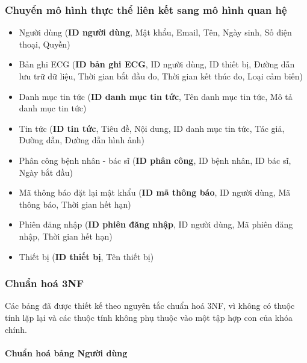 \subsubsection{Chuyển mô hình thực thể liên kết sang mô hình quan hệ}

\begin{itemize}
  \item Người dùng (\textbf{ID người dùng}, Mật khẩu, Email, Tên, Ngày sinh, Số điện thoại, Quyền)
  \item Bản ghi ECG (\textbf{ID bản ghi ECG}, ID người dùng, ID thiết bị, Đường dẫn lưu trữ dữ liệu, Thời gian bắt đầu đo, Thời gian kết thúc đo, Loại cảm biến)
  \item Danh mục tin tức (\textbf{ID danh mục tin tức}, Tên danh mục tin tức, Mô tả danh mục tin tức)
  \item Tin tức (\textbf{ID tin tức}, Tiêu đề, Nội dung, ID danh mục tin tức, Tác giả, Đường dẫn, Đường dẫn hình ảnh)
  \item Phân công bệnh nhân - bác sĩ (\textbf{ID phân công}, ID bệnh nhân, ID bác sĩ, Ngày bắt đầu)
  \item Mã thông báo đặt lại mật khẩu (\textbf{ID mã thông báo}, ID người dùng, Mã thông báo, Thời gian hết hạn)
  \item Phiên đăng nhập (\textbf{ID phiên đăng nhập}, ID người dùng, Mã phiên đăng nhập, Thời gian hết hạn)
  \item Thiết bị (\textbf{ID thiết bị}, Tên thiết bị)
\end{itemize}


\subsubsection{Chuẩn hoá 3NF}
Các bảng đã được thiết kế theo nguyên tắc chuẩn hoá 3NF, vì không có thuộc tính lặp lại và các thuộc tính không phụ thuộc vào một tập hợp con của khóa chính.

\paragraph{Chuẩn hoá bảng Người dùng}
\mbox{}

